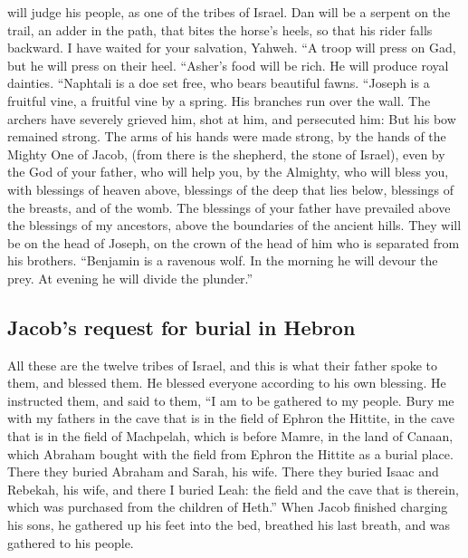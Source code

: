 will judge his people, as one of the tribes of Israel. 
Dan will be a serpent on the trail, an adder in the path, that bites the
horse's heels, so that his rider falls backward.  I have
waited for your salvation, Yahweh.  ``A troop will press
on Gad, but he will press on their heel.  ``Asher's food
will be rich. He will produce royal dainties.  ``Naphtali
is a doe set free, who bears beautiful fawns.  ``Joseph
is a fruitful vine, a fruitful vine by a spring. His branches run over
the wall.  The archers have severely grieved him, shot at
him, and persecuted him:  But his bow remained strong.
The arms of his hands were made strong, by the hands of the Mighty One
of Jacob, (from there is the shepherd, the stone of Israel),
 even by the God of your father, who will help you, by
the Almighty, who will bless you, with blessings of heaven above,
blessings of the deep that lies below, blessings of the breasts, and of
the womb.  The blessings of your father have prevailed
above the blessings of my ancestors, above the boundaries of the ancient
hills. They will be on the head of Joseph, on the crown of the head of
him who is separated from his brothers.  ``Benjamin is a
ravenous wolf. In the morning he will devour the prey. At evening he
will divide the plunder.''

\hypertarget{jacobs-request-for-burial-in-hebron}{%
\subsection{Jacob's request for burial in
Hebron}\label{jacobs-request-for-burial-in-hebron}}

 All these are the twelve tribes of Israel, and this is
what their father spoke to them, and blessed them. He blessed everyone
according to his own blessing.  He instructed them, and
said to them, ``I am to be gathered to my people. Bury me with my
fathers in the cave that is in the field of Ephron the Hittite,
 in the cave that is in the field of Machpelah, which is
before Mamre, in the land of Canaan, which Abraham bought with the field
from Ephron the Hittite as a burial place.  There they
buried Abraham and Sarah, his wife. There they buried Isaac and Rebekah,
his wife, and there I buried Leah:  the field and the
cave that is therein, which was purchased from the children of Heth.''
 When Jacob finished charging his sons, he gathered up
his feet into the bed, breathed his last breath, and was gathered to his
people.

